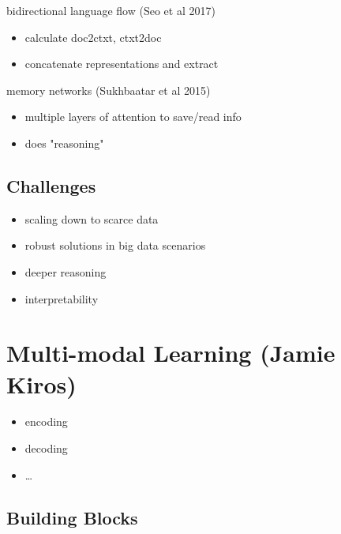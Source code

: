 \documentclass[]{article}
\theoremstyle{definition}
\begin{document}
    bidirectional language flow (Seo et al 2017)
    \begin{itemize}
        \item calculate doc2ctxt, ctxt2doc
        \item concatenate representations and extract
    \end{itemize}

    memory networks (Sukhbaatar et al 2015)
    \begin{itemize}
        \item multiple layers of attention to save/read info
        \item does "reasoning"
    \end{itemize}

    \subsection{Challenges}%
    \label{sub:challenges}

    \begin{itemize}
        \item scaling down to scarce data
        \item robust solutions in big data scenarios
        \item deeper reasoning
        \item interpretability
    \end{itemize}


    \section{Multi-modal Learning {\small (Jamie Kiros)}}%
    \label{sec:multi_modal_learning_small_jamie_kiros_}

    \begin{itemize}
        \item encoding
        \item decoding
        \item \ldots
    \end{itemize}

    \subsection{Building Blocks}%
    \label{sub:building_blocks}
\end{document}
